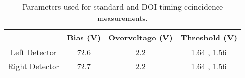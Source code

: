 \begin{table}
\caption{\label{tab:optimumparam} Parameters used for standard and DOI timing coincidence measurements.} 
\begin{tabular}{cccc}
\hline
{} & Bias (V) & Overvoltage (V) & Threshold (V) \\
\hline
Left Detector  &     72.6 &             2.2 &   1.64 , 1.56 \\
Right Detector &     72.7 &             2.2 &   1.64 , 1.56 \\
\hline
\end{tabular}
\end{table}

